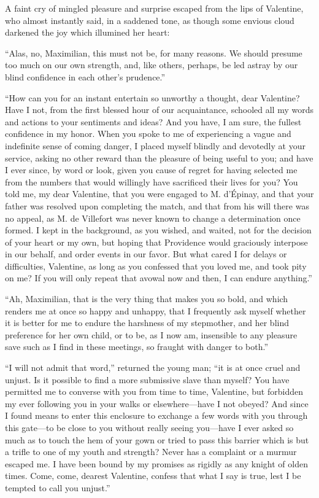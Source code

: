 A faint cry of mingled pleasure and surprise escaped from the lips of
Valentine, who almost instantly said, in a saddened tone, as though
some envious cloud darkened the joy which illumined her heart:

“Alas, no, Maximilian, this must not be, for many reasons. We should
presume too much on our own strength, and, like others, perhaps, be led
astray by our blind confidence in each other’s prudence.”

“How can you for an instant entertain so unworthy a thought, dear
Valentine? Have I not, from the first blessed hour of our acquaintance,
schooled all my words and actions to your sentiments and ideas? And you
have, I am sure, the fullest confidence in my honor. When you spoke to
me of experiencing a vague and indefinite sense of coming danger, I
placed myself blindly and devotedly at your service, asking no other
reward than the pleasure of being useful to you; and have I ever since,
by word or look, given you cause of regret for having selected me from
the numbers that would willingly have sacrificed their lives for you?
You told me, my dear Valentine, that you were engaged to M. d’Épinay,
and that your father was resolved upon completing the match, and that
from his will there was no appeal, as M. de Villefort was never known
to change a determination once formed. I kept in the background, as you
wished, and waited, not for the decision of your heart or my own, but
hoping that Providence would graciously interpose in our behalf, and
order events in our favor. But what cared I for delays or difficulties,
Valentine, as long as you confessed that you loved me, and took pity on
me? If you will only repeat that avowal now and then, I can endure
anything.”

“Ah, Maximilian, that is the very thing that makes you so bold, and
which renders me at once so happy and unhappy, that I frequently ask
myself whether it is better for me to endure the harshness of my
stepmother, and her blind preference for her own child, or to be, as I
now am, insensible to any pleasure save such as I find in these
meetings, so fraught with danger to both.”

“I will not admit that word,” returned the young man; “it is at once
cruel and unjust. Is it possible to find a more submissive slave than
myself? You have permitted me to converse with you from time to time,
Valentine, but forbidden my ever following you in your walks or
elsewhere—have I not obeyed? And since I found means to enter this
enclosure to exchange a few words with you through this gate—to be
close to you without really seeing you—have I ever asked so much as to
touch the hem of your gown or tried to pass this barrier which is but a
trifle to one of my youth and strength? Never has a complaint or a
murmur escaped me. I have been bound by my promises as rigidly as any
knight of olden times. Come, come, dearest Valentine, confess that what
I say is true, lest I be tempted to call you unjust.”

